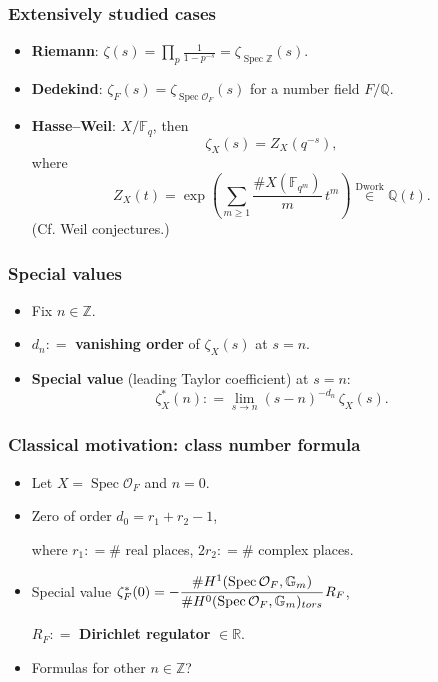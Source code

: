 \documentclass[handout]{beamer}
\newcommand{\ZZ}{\mathbb{Z}}
\newcommand{\QQ}{\mathbb{Q}}
\newcommand{\RR}{\mathbb{R}}
\newcommand{\FF}{\mathbb{F}}
\newcommand{\dfn}{\mathrel{\mathop:}=}
\DeclareMathOperator{\Spec}{Spec}
\newcommand{\term}{\textbf}
\begin{document}

\begin{frame}
  \frametitle{Extensively studied cases}

  \begin{itemize}
  \item<2-> \textbf{Riemann}:
    $\zeta (s) = \prod_p \frac{1}{1 - p^{-s}} = \zeta_{\Spec \ZZ} (s)$.

  \item<3-> \textbf{Dedekind}: $\zeta_F (s) = \zeta_{\Spec \mathcal{O}_F} (s)$
    for a number field $F/\QQ$.

  \item<4-> \textbf{Hasse--Weil}: $X/\FF_q$, then
    $$\zeta_X (s) = Z_X (q^{-s}),$$
    where
    $$Z_X (t) = \exp \left(\sum_{m \ge 1} \frac{\# X (\FF_{q^m})}{m}\,t^m\right) \stackrel{\text{Dwork}}{\in} \QQ (t).$$
    (Cf. Weil conjectures.)
  \end{itemize}
\end{frame}


\begin{frame}
  \frametitle{Special values}

  \begin{itemize}
  \item<2-> Fix $n \in \ZZ$.

  \item<3-> $d_n \dfn$ \term{vanishing order} of $\zeta_X (s)$ at $s = n$.

  \item<4-> \term{Special value} (leading Taylor coefficient) at $s = n$:
    $$\zeta_X^* (n) \dfn \lim_{s \to n} (s-n)^{-d_n}\,\zeta_X (s).$$
  \end{itemize}
\end{frame}


\begin{frame}
  \frametitle{Classical motivation: class number formula}

  \begin{itemize}
  \item<2-> Let $X = \Spec \mathcal{O}_F$ and $n = 0$.

  \item<3-> Zero of order $d_0 = r_1 + r_2 - 1$,

    where $r_1 \dfn \#$ real places, $2 r_2 \dfn \#$ complex places.

  \item<4->Special value
    $\zeta_F^* (0) = - \cfrac{\# H^1 (\Spec \mathcal{O}_F, \mathbb{G}_m)}{\# H^0 (\Spec \mathcal{O}_F, \mathbb{G}_m)_{tors}}\,R_F$,

    $R_F \dfn$ \textbf{Dirichlet regulator} $\in \RR$.

  \item<5-> Formulas for other $n \in \ZZ$?
  \end{itemize}
\end{frame}
\end{document}
